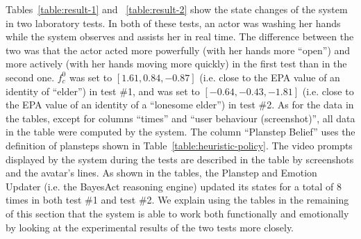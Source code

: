 Tables~\ref{table:result-1} and ~\ref{table:result-2} show the state changes of the system in two laboratory tests. In both of these tests, an actor was washing her hands while the system observes and assists her in real time. The difference between the two was that the actor acted more powerfully (with her hands more ``open'') and more actively (with her hands moving more quickly) in the first test than in the second one. $f_c^0$ was set to $[1.61, 0.84, -0.87]$ (i.e. close to the EPA value of an identity of ``elder'') in test \#1, and was set to $[-0.64, -0.43, -1.81]$ (i.e. close to the EPA value of an identity of a ``lonesome elder'') in test \#2. As for the data in the tables, except for columns ``times'' and ``user behaviour (screenshot)'', all data in the table were computed by the system. The column ``Planstep Belief'' uses the definition of plansteps shown in Table~\ref{table:heuristic-policy}. The video prompts displayed by the system during the tests are described in the table by screenshots and the avatar's lines. As shown in the tables, the Planstep and Emotion Updater (i.e. the BayesAct reasoning engine) updated its states for a total of 8 times in both test \#1 and test \#2. We explain using the tables in the remaining of this section that the system is able to work both functionally and emotionally by looking at the experimental results of the two tests more closely.

%

